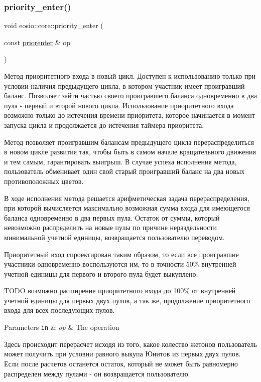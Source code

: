 \subsubsection{\texorpdfstring{priority\+\_\+enter()}{priority\_enter()}}
{\footnotesize\ttfamily void eosio\+::core\+::priority\+\_\+enter (\begin{DoxyParamCaption}\item[{const \mbox{\hyperlink{structeosio_1_1priorenter}{priorenter}} \&}]{op }\end{DoxyParamCaption})\hspace{0.3cm}{\ttfamily [inline]}}



Метод приоритетного входа в новый цикл. Доступен к использованию только при условии наличия предыдущего цикла, в котором участник имеет проигравший баланс. Позволяет зайти частью своего проигравшего баланса одновременно в два пула -\/ первый и второй нового цикла. Использование приоритетного входа возможно только до истечения времени приоритета, которое начинается в момент запуска цикла и продолжается до истечения таймера приоритета. 

Метод позволяет проигравшим балансам предыдущего цикла перераспределиться в новом цикле развития так, чтобы быть в самом начале вращательного движения и тем самым, гарантировать выигрыш. В случае успеха исполнения метода, пользователь обменивает один свой старый проигравший баланс на два новых противоположных цветов.

В ходе исполнения метода решается арифметическая задача перераспределения, при которой вычисляется максимально возможная сумма входа для имеющегося баланса одновременно в два первых пула. Остаток от суммы, который невозможно распределить на новые пулы по причине нераздельности минимальной учетной единицы, возвращается пользователю переводом.

Приоритетный вход спроектирован таким образом, то если все проигравшие участники одновременно воспользуются им, то в точности 50\% внутренней учетной единицы для первого и второго пула будет выкуплено.

T\+O\+DO возможно расширение приоритетного входа до 100\% от внутренней учетной единицы для первых двух пулов, а так же, продолжение приоритетного входа для всех последующих пулов.


\begin{DoxyParams}[1]{Parameters}
\mbox{\tt in}  & {\em op} & The operation \\
\hline
\end{DoxyParams}
Здесь происходит перерасчет исходя из того, какое колество жетонов пользователь может получить при условии равного выкупа Юнитов из первых двух пулов. Если после расчетов останется остаток, который не может быть равномерно распределен между пулами -\/ он возвращается пользователю.

